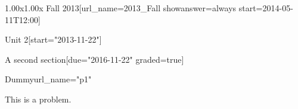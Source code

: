 \documentclass[12pt]{article}
\begin{document}
\begin{edXcourse}{1.00x}{1.00x Fall 2013}[url_name=2013_Fall showanswer=always start=2014-05-11T12:00]
\begin{edXchapter}{Unit 2}[start="2013-11-22"]
\begin{edXsection}{A second section}[due="2016-11-22" graded=true]

\begin{edXproblem}{Dummy}{url_name="p1"}
 
This is a problem.


\end{edXproblem}



\end{edXsection}
\end{edXchapter}
\end{edXcourse}

\end{document}
